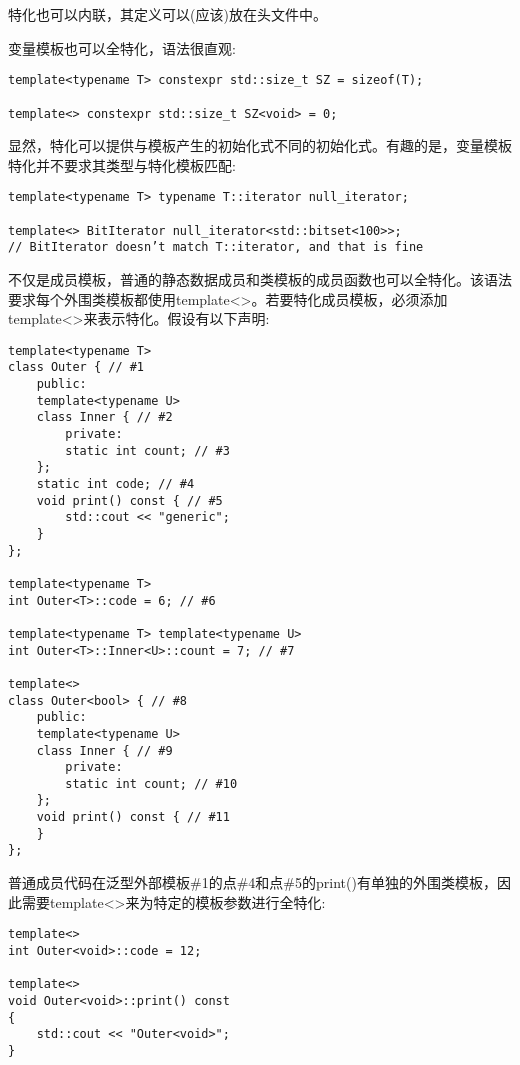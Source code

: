 特化也可以内联，其定义可以(应该)放在头文件中。


变量模板也可以全特化，语法很直观:

\begin{lstlisting}[style=styleCXX]
template<typename T> constexpr std::size_t SZ = sizeof(T);

template<> constexpr std::size_t SZ<void> = 0;
\end{lstlisting}

显然，特化可以提供与模板产生的初始化式不同的初始化式。有趣的是，变量模板特化并不要求其类型与特化模板匹配:

\begin{lstlisting}[style=styleCXX]
template<typename T> typename T::iterator null_iterator;

template<> BitIterator null_iterator<std::bitset<100>>;
// BitIterator doesn’t match T::iterator, and that is fine
\end{lstlisting}


不仅是成员模板，普通的静态数据成员和类模板的成员函数也可以全特化。该语法要求每个外围类模板都使用template<>。若要特化成员模板，必须添加template<>来表示特化。假设有以下声明:

\begin{lstlisting}[style=styleCXX]
template<typename T>
class Outer { // #1
	public:
	template<typename U>
	class Inner { // #2
		private:
		static int count; // #3
	};
	static int code; // #4
	void print() const { // #5
		std::cout << "generic";
	}
};

template<typename T>
int Outer<T>::code = 6; // #6

template<typename T> template<typename U>
int Outer<T>::Inner<U>::count = 7; // #7

template<>
class Outer<bool> { // #8
	public:
	template<typename U>
	class Inner { // #9
		private:
		static int count; // #10
	};
	void print() const { // #11
	}
};
\end{lstlisting}

普通成员代码在泛型外部模板\#1的点\#4和点\#5的print()有单独的外围类模板，因此需要template<>来为特定的模板参数进行全特化:

\begin{lstlisting}[style=styleCXX]
template<>
int Outer<void>::code = 12;

template<>
void Outer<void>::print() const
{
	std::cout << "Outer<void>";
}
\end{lstlisting}

